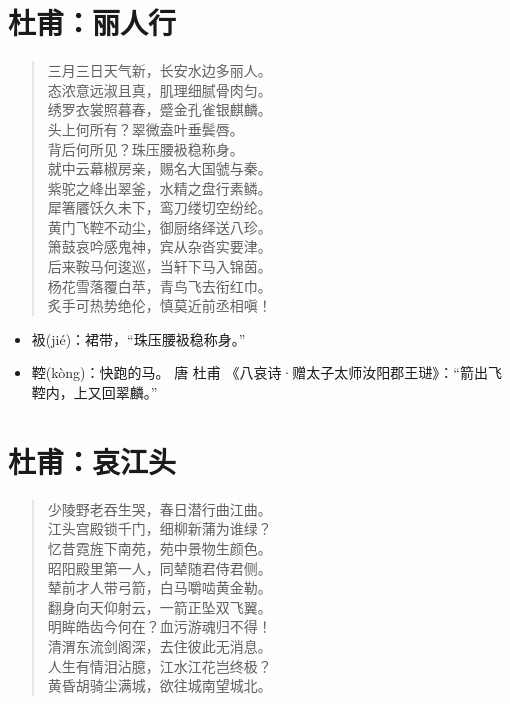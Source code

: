 \documentclass[12pt,oneside]{book}
\newenvironment{shici}{
\begin{verse}
\centering\large\hspace{12pt}}
{\end{verse}}
\begin{document}
\chapter{杜甫：丽人行}
\begin{shici}
三月三日天气新，长安水边多丽人。\\
态浓意远淑且真，肌理细腻骨肉匀。\\
绣罗衣裳照暮春，蹙金孔雀银麒麟。\\
头上何所有？翠微盍叶垂鬓唇。\\
背后何所见？珠压腰衱稳称身。\\
就中云幕椒房亲，赐名大国虢与秦。\\
紫驼之峰出翠釜，水精之盘行素鳞。\\
犀箸餍饫久未下，鸾刀缕切空纷纶。\\
黄门飞鞚不动尘，御厨络绎送八珍。\\
箫鼓哀吟感鬼神，宾从杂沓实要津。\\
后来鞍马何逡巡，当轩下马入锦茵。\\
杨花雪落覆白苹，青鸟飞去衔红巾。\\
炙手可热势绝伦，慎莫近前丞相嗔！
\end{shici}

\begin{itemize}
\item 衱(jié)：裙带，“珠压腰衱稳称身。”
\item 鞚(kòng)：快跑的马。 唐 杜甫 《八哀诗·赠太子太师汝阳郡王琎》：“箭出飞鞚内，上又回翠麟。”
\end{itemize}


\chapter{杜甫：哀江头}
\begin{shici}
少陵野老吞生哭，春日潜行曲江曲。\\
江头宫殿锁千门，细柳新蒲为谁绿？\\
忆昔霓旌下南苑，苑中景物生颜色。\\
昭阳殿里第一人，同辇随君侍君侧。\\
辇前才人带弓箭，白马嚼啮黄金勒。\\
翻身向天仰射云，一箭正坠双飞翼。\\
明眸皓齿今何在？血污游魂归不得！\\
清渭东流剑阁深，去住彼此无消息。\\
人生有情泪沾臆，江水江花岂终极？\\
黄昏胡骑尘满城，欲往城南望城北。
\end{shici}
\end{document}
